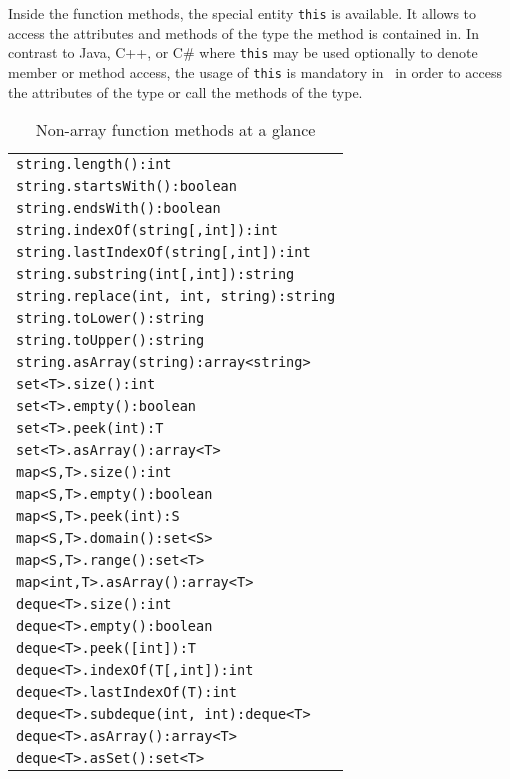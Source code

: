 Inside the function methods, the special entity \texttt{this} is available.
It allows to access the attributes and methods of the type the method is contained in.
In contrast to Java, C++, or C\# where \texttt{this} may be used optionally to denote member or method access,
the usage of \texttt{this} is mandatory in \GrG~in order to access the attributes of the type or call the methods of the type.

\begin{table}[htbp]
\centering
\begin{tabular}{|l|}
\hline
\texttt{string.length():int}\\
\texttt{string.startsWith():boolean}\\
\texttt{string.endsWith():boolean}\\
\texttt{string.indexOf(string[,int]):int}\\
\texttt{string.lastIndexOf(string[,int]):int}\\
\texttt{string.substring(int[,int]):string}\\
\texttt{string.replace(int, int, string):string}\\
\texttt{string.toLower():string}\\
\texttt{string.toUpper():string}\\
\texttt{string.asArray(string):array<string>}\\
\hline
\texttt{set<T>.size():int}\\
\texttt{set<T>.empty():boolean}\\
\texttt{set<T>.peek(int):T}\\
\texttt{set<T>.asArray():array<T>}\\
\hline
\texttt{map<S,T>.size():int}\\
\texttt{map<S,T>.empty():boolean}\\
\texttt{map<S,T>.peek(int):S}\\
\texttt{map<S,T>.domain():set<S>}\\
\texttt{map<S,T>.range():set<T>}\\
\texttt{map<int,T>.asArray():array<T>}\\
\hline
\texttt{deque<T>.size():int}\\
\texttt{deque<T>.empty():boolean}\\
\texttt{deque<T>.peek([int]):T}\\
\texttt{deque<T>.indexOf(T[,int]):int}\\
\texttt{deque<T>.lastIndexOf(T):int}\\
\texttt{deque<T>.subdeque(int, int):deque<T>}\\
\texttt{deque<T>.asArray():array<T>}\\
\texttt{deque<T>.asSet():set<T>}\\
\hline
\end{tabular}
\caption{Non-array function methods at a glance}
\label{funcmethstab}
\end{table}


